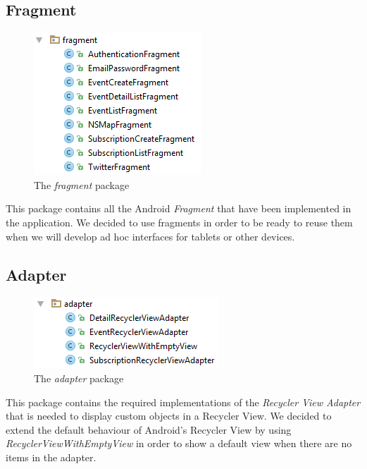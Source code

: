 \documentclass[a4paper]{scrreprt}
\begin{document}
\subsection{Fragment}
\begin{figure}[H]
	\centering
	\includegraphics{imgs/pack_fragment}
	\caption{The \emph{fragment} package}
\end{figure}
This package contains all the Android \emph{Fragment} that have been implemented in the application. We decided to use fragments in order to be ready to reuse them when we will develop ad hoc interfaces for tablets or other devices.

\subsection{Adapter}
\begin{figure}[H]
	\centering
	\includegraphics{imgs/pack_adapter}
	\caption{The \emph{adapter} package}
\end{figure}
This package contains the required implementations of the \emph{Recycler View Adapter} that is needed to display custom objects in a Recycler View. We decided to extend the default behaviour of Android's Recycler View by using \emph{RecyclerViewWithEmptyView} in order to show a default view when there are no items in the adapter.
\end{document}
